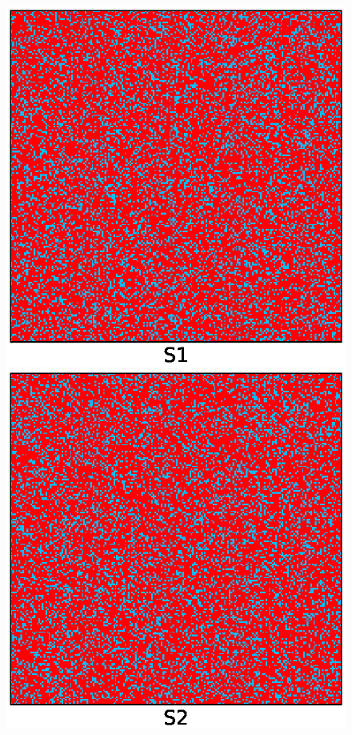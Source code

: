 \begin{figure}
    \begin{minipage}[c]{0.45\textwidth}
        \centering 
        \includegraphics*[scale=0.45]{images/ising/mixing_S1_after}
    \end{minipage}
    \hfill
    \begin{minipage}[c]{0.45\textwidth}
        \centering 
        \includegraphics*[scale=0.45]{images/ising/mixing_S2_after}

\end{minipage}
\end{figure}
